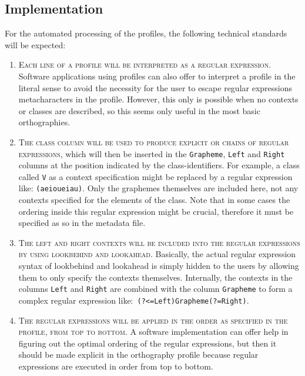 \subsection*{Implementation}
For the automated processing of the profiles, the following technical standards
will be expected:

\begin{enumerate}
	\def\labelenumi{B\arabic{enumi}.} 
	\item \textsc{Each line of a profile will be interpreted as a regular
       expression. }Software applications using profiles can also offer to
       interpret a profile in the literal sense to avoid the necessity for the
       user to escape regular expressions metacharacters in the profile.
       However, this only is possible when no contexts or classes are described,
       so this seems only useful in the most basic orthographies. 
	\item \textsc{The \textsc{class} column will be used to produce explicit
       \textsc{or} chains of regular expressions}, which will then be inserted
       in the \texttt{Grapheme}, \texttt{Left} and \texttt{Right} columns at
       the position indicated by the class-identifiers. For example, a class
       called \texttt{V} as a context specification might be replaced by a regular
       expression like:
       \texttt{(a\textbar{}e\textbar{}i\textbar{}o\textbar{}u\textbar{}ei\textbar{}au)}.
       Only the graphemes themselves are included here, not any contexts
       specified for the elements of the class. Note that in some cases the 
       ordering inside this regular expression might be crucial, therefore it must be 
	   specified as so in the metadata file.
	\item \textsc{The \textsc{left} and \textsc{right} contexts will be included
       into the regular expressions by using lookbehind and lookahead}.
       Basically, the actual regular expression syntax of lookbehind and
       lookahead is simply hidden to the users by allowing them to only specify
       the contexts themselves. Internally, the contexts in the columns
       \texttt{Left} and \texttt{Right} are combined with the column
       \texttt{Grapheme} to form a complex regular expression like:\ 
       \texttt{(?\textless{}=Left)Grapheme(?=Right)}. 
	\item \textsc{The regular expressions will be applied in the order as specified
       in the profile, from top to bottom.} A software implementation can offer
       help in figuring out the optimal ordering of the regular expressions, but
       then it should be made explicit in the orthography profile because regular 
	   expressions are executed in order from top to bottom.
\end{enumerate}

